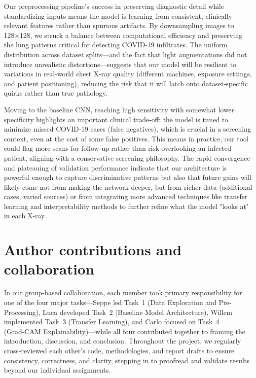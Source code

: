 \documentclass[conference]{IEEEtran}
\begin{document}
Our preprocessing pipeline’s success in preserving diagnostic detail while standardizing inputs means the model is learning from consistent, clinically relevant features rather than spurious artifacts. By downsampling images to 128×128, we struck a balance between computational efficiency and preserving the lung patterns critical for detecting COVID‑19 infiltrates. The uniform distribution across dataset splits—and the fact that light augmentations did not introduce unrealistic distortions—suggests that our model will be resilient to variations in real‑world chest X‑ray quality (different machines, exposure settings, and patient positioning), reducing the risk that it will latch onto dataset‐specific quirks rather than true pathology.

Moving to the baseline CNN, reaching high sensitivity with somewhat lower specificity highlights an important clinical trade‑off: the model is tuned to minimize missed COVID‑19 cases (false negatives), which is crucial in a screening context, even at the cost of some false positives. This means in practice, our tool could flag more scans for follow‑up rather than risk overlooking an infected patient, aligning with a conservative screening philosophy. The rapid convergence and plateauing of validation performance indicate that our architecture is powerful enough to capture discriminative patterns but also that future gains will likely come not from making the network deeper, but from richer data (additional cases, varied sources) or from integrating more advanced techniques like transfer learning and interpretability methods to further refine what the model "looks at" in each X‑ray.

\section{Author contributions and collaboration}

In our group‐based collaboration, each member took primary responsibility for one of the four major tasks—Seppe led Task 1 (Data Exploration and Pre‐Processing), Luca developed Task 2 (Baseline Model Architecture), Willem implemented Task 3 (Transfer Learning), and Carlo focused on Task 4 (Grad‑CAM Explainability)—while all four contributed together to framing the introduction, discussion, and conclusion. Throughout the project, we regularly cross‐reviewed each other’s code, methodologies, and report drafts to ensure consistency, correctness, and clarity, stepping in to proofread and validate results beyond our individual assignments.
\end{document}
